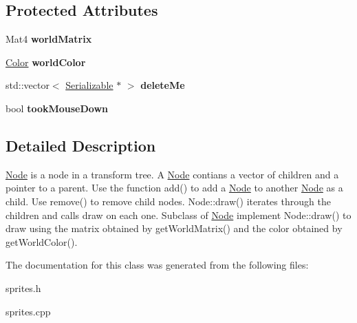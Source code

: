 \subsection*{Protected Attributes}
\begin{DoxyCompactItemize}
\item 
\hypertarget{classg2c_1_1_node_a2bb636303985bd4142fcdbde26155a9c}{
Mat4 {\bfseries worldMatrix}}
\label{classg2c_1_1_node_a2bb636303985bd4142fcdbde26155a9c}

\item 
\hypertarget{classg2c_1_1_node_a45679634d96127e18d4c179cae945ef8}{
\hyperlink{classg2c_1_1_color}{Color} {\bfseries worldColor}}
\label{classg2c_1_1_node_a45679634d96127e18d4c179cae945ef8}

\item 
\hypertarget{classg2c_1_1_node_ad99c625bc596afb6b4501f5e627caa60}{
std::vector$<$ \hyperlink{classg2c_1_1_serializable}{Serializable} $\ast$ $>$ {\bfseries deleteMe}}
\label{classg2c_1_1_node_ad99c625bc596afb6b4501f5e627caa60}

\item 
\hypertarget{classg2c_1_1_node_a45bdf85daa254590f8f31bcedd0a53e8}{
bool {\bfseries tookMouseDown}}
\label{classg2c_1_1_node_a45bdf85daa254590f8f31bcedd0a53e8}

\end{DoxyCompactItemize}


\subsection{Detailed Description}
\hyperlink{classg2c_1_1_node}{Node} is a node in a transform tree. A \hyperlink{classg2c_1_1_node}{Node} contians a vector of children and a pointer to a parent. Use the function add() to add a \hyperlink{classg2c_1_1_node}{Node} to another \hyperlink{classg2c_1_1_node}{Node} as a child. Use remove() to remove child nodes. Node::draw() iterates through the children and calls draw on each one. Subclass of \hyperlink{classg2c_1_1_node}{Node} implement Node::draw() to draw using the matrix obtained by getWorldMatrix() and the color obtained by getWorldColor(). 

The documentation for this class was generated from the following files:\begin{DoxyCompactItemize}
\item 
sprites.h\item 
sprites.cpp\end{DoxyCompactItemize}
